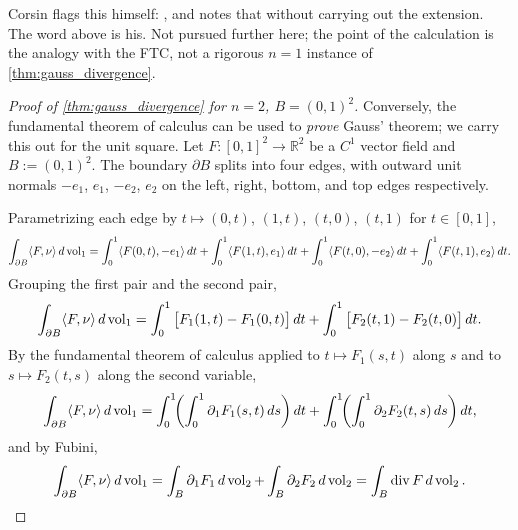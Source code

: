 \begin{ainote}
Corsin flags this himself: , and notes that  without carrying out the extension.
The word  above is his. Not pursued further here; the point of the calculation is
the analogy with the FTC, not a rigorous $n=1$ instance of \cref{thm:gauss_divergence}.
\end{ainote}

\begin{proof}[Proof of \cref{thm:gauss_divergence} for $n=2$, $B = (0,1)^2$]
Conversely, the fundamental theorem of calculus can be used to \emph{prove} Gauss' theorem;
we carry this out for the unit square. Let $F : [0,1]^2 \to \mathbb{R}^2$ be a $C^1$ vector
field and $B := (0,1)^2$. The boundary $\partial B$ splits into four edges, with outward unit
normals $-e_1$, $e_1$, $-e_2$, $e_2$ on the left, right, bottom, and top edges respectively.

\begin{center}
\end{center}

Parametrizing each edge by $t \mapsto (0,t)$, $(1,t)$, $(t,0)$, $(t,1)$ for $t \in [0,1]$,
\[
\int_{\partial B} \langle F,\nu\rangle\,d\operatorname{vol}_1
  = \int_0^1 \langle F(0,t),-e_1\rangle\,dt + \int_0^1 \langle F(1,t),e_1\rangle\,dt
  + \int_0^1 \langle F(t,0),-e_2\rangle\,dt + \int_0^1 \langle F(t,1),e_2\rangle\,dt.
\]
Grouping the first pair and the second pair,
\[
\int_{\partial B} \langle F,\nu\rangle\,d\operatorname{vol}_1
  = \int_0^1 \big[F_1(1,t) - F_1(0,t)\big]\,dt + \int_0^1 \big[F_2(t,1) - F_2(t,0)\big]\,dt.
\]
By the fundamental theorem of calculus applied to $t \mapsto F_1(s,t)$ along $s$ and to
$s \mapsto F_2(t,s)$ along the second variable,
\[
\int_{\partial B} \langle F,\nu\rangle\,d\operatorname{vol}_1
  = \int_0^1\!\!\left(\int_0^1 \partial_1 F_1(s,t)\,ds\right) dt
  + \int_0^1\!\!\left(\int_0^1 \partial_2 F_2(t,s)\,ds\right) dt,
\]
and by Fubini,
\[
\int_{\partial B} \langle F,\nu\rangle\,d\operatorname{vol}_1
  = \int_B \partial_1 F_1\,d\operatorname{vol}_2 + \int_B \partial_2 F_2\,d\operatorname{vol}_2
  = \int_B \operatorname{div} F\,d\operatorname{vol}_2. \qedhere
\]
\end{proof}
